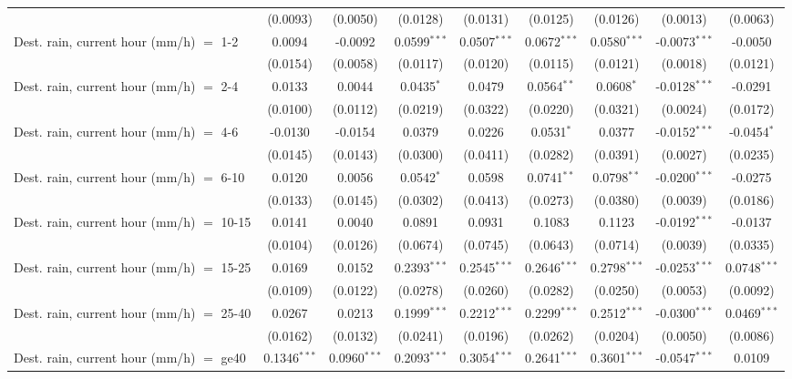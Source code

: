 \begin{tabular}{lcccccccc}
    & (0.0093) & (0.0050) & (0.0128) & (0.0131) & (0.0125) & (0.0126) & (0.0013) & (0.0063)\\
   Dest. rain, current hour (mm/h) $=$ 1-2 & 0.0094 & -0.0092 & 0.0599$^{***}$ & 0.0507$^{***}$ & 0.0672$^{***}$ & 0.0580$^{***}$ & -0.0073$^{***}$ & -0.0050\\
    & (0.0154) & (0.0058) & (0.0117) & (0.0120) & (0.0115) & (0.0121) & (0.0018) & (0.0121)\\
   Dest. rain, current hour (mm/h) $=$ 2-4 & 0.0133 & 0.0044 & 0.0435$^{*}$ & 0.0479 & 0.0564$^{**}$ & 0.0608$^{*}$ & -0.0128$^{***}$ & -0.0291\\
    & (0.0100) & (0.0112) & (0.0219) & (0.0322) & (0.0220) & (0.0321) & (0.0024) & (0.0172)\\
   Dest. rain, current hour (mm/h) $=$ 4-6 & -0.0130 & -0.0154 & 0.0379 & 0.0226 & 0.0531$^{*}$ & 0.0377 & -0.0152$^{***}$ & -0.0454$^{*}$\\
    & (0.0145) & (0.0143) & (0.0300) & (0.0411) & (0.0282) & (0.0391) & (0.0027) & (0.0235)\\
   Dest. rain, current hour (mm/h) $=$ 6-10 & 0.0120 & 0.0056 & 0.0542$^{*}$ & 0.0598 & 0.0741$^{**}$ & 0.0798$^{**}$ & -0.0200$^{***}$ & -0.0275\\
    & (0.0133) & (0.0145) & (0.0302) & (0.0413) & (0.0273) & (0.0380) & (0.0039) & (0.0186)\\
   Dest. rain, current hour (mm/h) $=$ 10-15 & 0.0141 & 0.0040 & 0.0891 & 0.0931 & 0.1083 & 0.1123 & -0.0192$^{***}$ & -0.0137\\
    & (0.0104) & (0.0126) & (0.0674) & (0.0745) & (0.0643) & (0.0714) & (0.0039) & (0.0335)\\
   Dest. rain, current hour (mm/h) $=$ 15-25 & 0.0169 & 0.0152 & 0.2393$^{***}$ & 0.2545$^{***}$ & 0.2646$^{***}$ & 0.2798$^{***}$ & -0.0253$^{***}$ & 0.0748$^{***}$\\
    & (0.0109) & (0.0122) & (0.0278) & (0.0260) & (0.0282) & (0.0250) & (0.0053) & (0.0092)\\
   Dest. rain, current hour (mm/h) $=$ 25-40 & 0.0267 & 0.0213 & 0.1999$^{***}$ & 0.2212$^{***}$ & 0.2299$^{***}$ & 0.2512$^{***}$ & -0.0300$^{***}$ & 0.0469$^{***}$\\
    & (0.0162) & (0.0132) & (0.0241) & (0.0196) & (0.0262) & (0.0204) & (0.0050) & (0.0086)\\
   Dest. rain, current hour (mm/h) $=$ ge40 & 0.1346$^{***}$ & 0.0960$^{***}$ & 0.2093$^{***}$ & 0.3054$^{***}$ & 0.2641$^{***}$ & 0.3601$^{***}$ & -0.0547$^{***}$ & 0.0109\\

\end{tabular}
